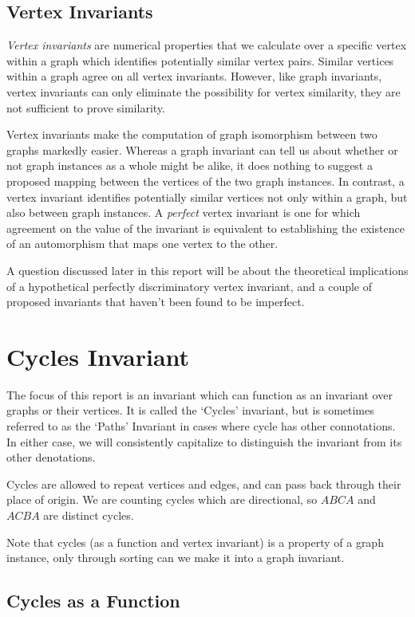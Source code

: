 \subsection{Vertex Invariants}
\emph{Vertex invariants} are numerical properties that we  calculate over a specific vertex within a graph which identifies potentially similar vertex pairs.
Similar vertices within a graph agree on all vertex invariants.
However, like graph invariants, vertex invariants can only eliminate the possibility for vertex similarity, they are not sufficient to prove similarity.

Vertex invariants make the computation of graph isomorphism between two graphs markedly easier. 
Whereas a graph invariant can tell us about whether or not graph instances as a whole might be alike, it does nothing to suggest a proposed mapping between the vertices of the two graph instances.
In contrast, a vertex invariant identifies potentially similar vertices not only within a graph, but also between graph instances.
A \emph{perfect} vertex invariant is one for which agreement on the value of the invariant is equivalent to establishing the existence of an automorphism that maps one vertex to the other.

A question discussed later in this report will be about the theoretical implications of a hypothetical perfectly discriminatory vertex invariant, and a couple of proposed invariants that haven't been found to be imperfect.



\section{Cycles Invariant}
The focus of this report is an invariant which can function as an invariant over graphs or their vertices.
It is called the `Cycles' invariant, but is sometimes referred to as the `Paths' Invariant in cases where cycle has other connotations.
In either case, we will consistently capitalize to distinguish the invariant from its other denotations.

Cycles are allowed to repeat vertices and edges, and can pass back through their place of origin.
We are counting cycles which are directional, so $ABCA$ and $ACBA$ are distinct cycles.

Note that cycles (as a function and vertex invariant) is a property of a graph instance, only through sorting can we make it into a graph invariant.


\subsection{Cycles as a Function}

